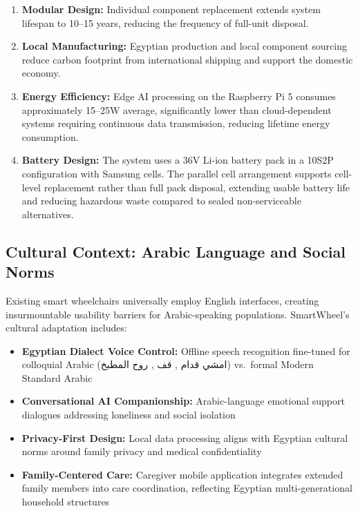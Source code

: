 \documentclass[12pt,a4paper]{report}
\begin{document}
\begin{enumerate}[leftmargin=*,itemsep=4pt]
    \item \textbf{Modular Design:} Individual component replacement extends system lifespan
          to 10--15 years, reducing the frequency of full-unit disposal.

    \item \textbf{Local Manufacturing:} Egyptian production and local component sourcing
          reduce carbon footprint from international shipping and support the
          domestic economy.

    \item \textbf{Energy Efficiency:} Edge AI processing on the Raspberry Pi 5 consumes
          approximately 15--25W average, significantly lower than cloud-dependent systems
          requiring continuous data transmission, reducing lifetime energy consumption.

    \item \textbf{Battery Design:} The system uses a 36V Li-ion battery pack in a 10S2P
          configuration with Samsung cells. The parallel cell arrangement supports
          cell-level replacement rather than full pack disposal, extending usable
          battery life and reducing hazardous waste compared to sealed
          non-serviceable alternatives.
\end{enumerate}
\subsection{Cultural Context: Arabic Language and Social Norms}

Existing smart wheelchairs universally employ English interfaces, creating insurmountable
usability barriers for Arabic-speaking populations. SmartWheel's cultural adaptation
includes:

\begin{itemize}[leftmargin=*,itemsep=4pt]
    \item \textbf{Egyptian Dialect Voice Control:} Offline speech recognition fine-tuned
          for colloquial Arabic (\textarabic{امشي قدام , قف , روح المطبخ})
          vs.\ formal Modern Standard Arabic
    \item \textbf{Conversational AI Companionship:} Arabic-language emotional support
          dialogues addressing loneliness and social isolation
    \item \textbf{Privacy-First Design:} Local data processing aligns with Egyptian
          cultural norms around family privacy and medical confidentiality
    \item \textbf{Family-Centered Care:} Caregiver mobile application integrates extended
          family members into care coordination, reflecting Egyptian multi-generational
          household structures
\end{itemize}
\end{document}
